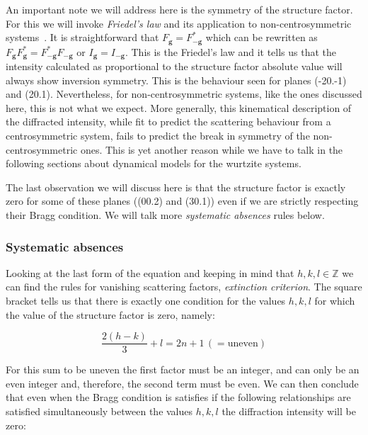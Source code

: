 An important note we will address here is the symmetry of the structure factor. For this we will invoke \textit{Friedel's law} and its application to non-centrosymmetric systems~\cite{Serneels73}. It is straightforward that $F_\mathbf{g}=F^*_{-\mathbf{g}}$ which can be rewritten as $F_\mathbf{g} F^*_\mathbf{g}=F^*_{-\mathbf{g}}F_{-\mathbf{g}}$ or $I_\mathbf{g}=I_\mathbf{-g}$. This is the Friedel's law and it tells us that the intensity calculated as proportional to the structure factor absolute value will always show inversion symmetry. This is the behaviour seen for planes \hkl(-20.-1) and \hkl(20.1). Nevertheless, for non-centrosymmetric systems, like the ones discussed here, this is not what we expect. More generally, this kinematical description of the diffracted intensity, while fit to predict the scattering behaviour from a centrosymmetric system, fails to predict the break in symmetry of the non-centrosymmetric ones.  This is yet another reason while we have to talk in the following sections about dynamical models for the wurtzite systems. 


The last observation we will discuss here is that the structure factor is exactly zero for some of these planes (\hkl(00.2) and \hkl(30.1)) even if we are strictly respecting their Bragg condition. We will talk more \textit{systematic absences} rules below. 


%
\subsubsection{Systematic absences }

 Looking at the last form of the equation and keeping in mind that $h,k,l \in  \mathbb{Z}$ we can find the rules for vanishing scattering factors, \ie \emph{extinction criterion}. The square bracket tells us that there is exactly one condition for the values $h,k,l$ for which the value of the structure factor is zero, namely:
 
 \begin{equation*}
     \frac{2(h-k)}{3} + l  = 2n+1 \, ( = \text{uneven})
 \end{equation*}

For this sum to be uneven the first factor must be an integer, and can only be an even integer and, therefore, the second term must be even. We can then conclude that even when the Bragg condition is satisfies if the following relationships are satisfied simultaneously between the values $h, k, l$ the diffraction intensity will be zero:

